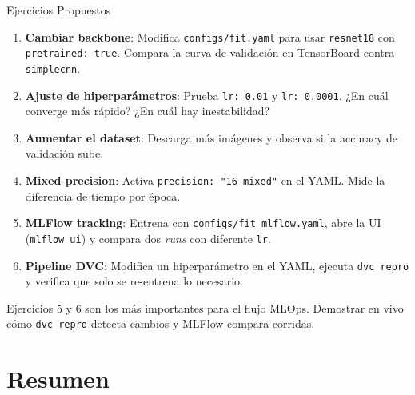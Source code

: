 \documentclass[aspectratio=169,10pt]{beamer}
\newcommand{\faIcon}[1]{\textbullet}
\newcommand{\faLightbulb}{\ding{171}}
\newcommand{\teachernote}[1]{%
    \begin{tcolorbox}[
        colback=pyorange!20, colframe=pyorange!80!black,
        fonttitle=\bfseries\small, title={\faLightbulb\ Nota docente},
        left=4pt, right=4pt, top=2pt, bottom=2pt, sharp corners
    ]
    \scriptsize #1
    \end{tcolorbox}
}
\newcommand{\codefile}[1]{\texttt{\textcolor{pyblue}{#1}}}
\begin{document}
\begin{frame}{Ejercicios Propuestos}

    \begin{enumerate}
        \item[\faIcon{flask}] \textbf{Cambiar backbone}: Modifica \codefile{configs/fit.yaml} para usar \texttt{resnet18} con \texttt{pretrained: true}.
        Compara la curva de validación en TensorBoard contra \texttt{simplecnn}.

        \vspace{4pt}
        \item[\faIcon{sliders}] \textbf{Ajuste de hiperparámetros}: Prueba \texttt{lr: 0.01} y \texttt{lr: 0.0001}.
        ¿En cuál converge más rápido? ¿En cuál hay inestabilidad?

        \vspace{4pt}
        \item[\faIcon{image}] \textbf{Aumentar el dataset}: Descarga más imágenes y observa si la accuracy de validación sube.

        \vspace{4pt}
        \item[\faIcon{microchip}] \textbf{Mixed precision}: Activa \texttt{precision: "16-mixed"} en el YAML.
        Mide la diferencia de tiempo por época.

        \vspace{4pt}
        \item[\faIcon{chart-bar}] \textbf{MLFlow tracking}: Entrena con \codefile{configs/fit\_mlflow.yaml}, abre la UI (\texttt{mlflow ui}) y compara dos \textit{runs} con diferente \texttt{lr}.

        \vspace{4pt}
        \item[\faIcon{code-branch}] \textbf{Pipeline DVC}: Modifica un hiperparámetro en el YAML, ejecuta \texttt{dvc repro} y verifica que solo se re-entrena lo necesario.
    \end{enumerate}

    \vspace{4pt}
    \teachernote{Ejercicios 5 y 6 son los más importantes para el flujo MLOps. Demostrar en vivo cómo \texttt{dvc repro} detecta cambios y MLFlow compara corridas.}
\end{frame}

\section{Resumen}
\end{document}
